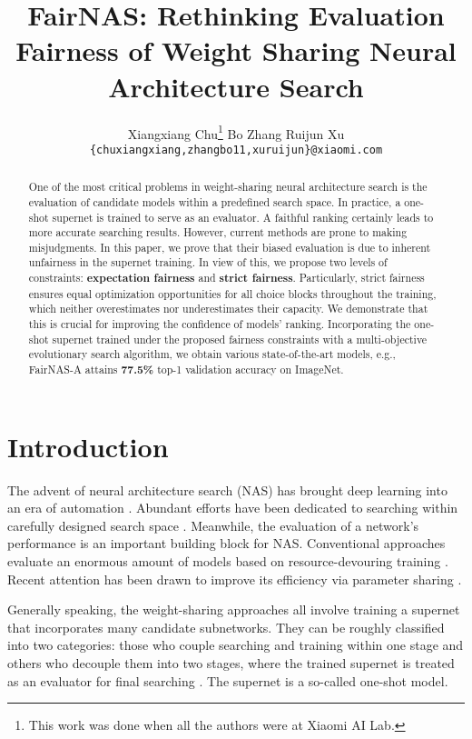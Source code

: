 \documentclass[10pt,twocolumn,letterpaper]{article}
\title{FairNAS: Rethinking Evaluation Fairness of Weight Sharing Neural Architecture Search}
\author{
Xiangxiang Chu\thanks{This work was done when all the authors were at Xiaomi AI Lab.} \quad Bo Zhang \quad Ruijun Xu \\
{\tt \{chuxiangxiang,zhangbo11,xuruijun\}@xiaomi.com}
}
\theoremstyle{definition}
\begin{document}
\maketitle

\begin{abstract}
One of the most critical problems in weight-sharing neural architecture search is the evaluation of candidate models within a predefined search space. In practice, a one-shot supernet is trained to serve as an evaluator. A faithful ranking certainly leads to more accurate searching results. However, current methods are prone to making misjudgments. In this paper, we prove that their biased evaluation is due to inherent unfairness in the supernet training. In view of this, we propose two levels of constraints: \textbf{expectation fairness} and \textbf{strict fairness}. Particularly, strict fairness ensures equal optimization opportunities for all choice blocks throughout the training, which neither overestimates nor underestimates their capacity. We demonstrate that this is crucial for improving the confidence of models' ranking. Incorporating the one-shot supernet trained under the proposed fairness constraints with a multi-objective evolutionary search algorithm, we obtain various state-of-the-art models, e.g., FairNAS-A attains \textbf{77.5\%} top-1 validation accuracy on ImageNet. 
\end{abstract}

\section{Introduction}
The advent of neural architecture search (NAS) has brought deep learning into an era of automation \cite{zoph2016neural}. Abundant efforts have been dedicated to searching  within carefully designed search space \cite{zoph2017learning,real2018regularized,tan2018mnasnet,lu2018nsga,tan2019efficientnet}. 
Meanwhile, the evaluation of a network's performance is an important building block for NAS. Conventional approaches evaluate an enormous amount of models based on resource-devouring training \cite{zoph2017learning,tan2018mnasnet}. Recent attention has been drawn to improve its efficiency via parameter sharing \cite{brock2017smash,liu2018darts,pham2018efficient,wu2018fbnet}. 

Generally speaking, the weight-sharing approaches all involve training a supernet that incorporates many candidate subnetworks. They can be roughly classified into two categories: those who couple searching and training within one stage \cite{pham2018efficient,liu2018darts,cai2018proxylessnas,stamoulis2019single,wu2018fbnet} and others who decouple them into two stages, where the trained supernet is treated as an evaluator for final searching \cite{brock2017smash,bender2018understanding,guo2019single,luo2018neural}. The supernet is a so-called one-shot model.
\end{document}
